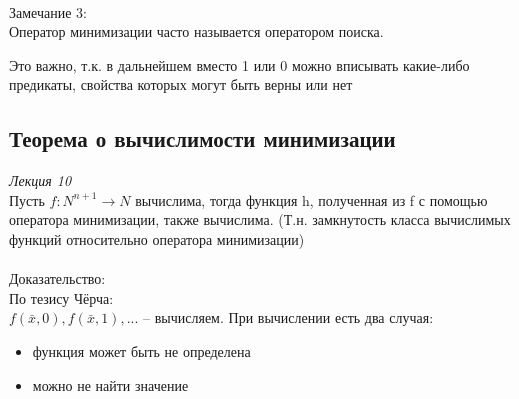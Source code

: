\documentclass{article}
\begin{document}
        \\Замечание 3:\\
        Оператор минимизации часто называется оператором поиска.
        
        Это важно, т.к. в дальнейшем вместо 1 или 0 можно вписывать какие-либо предикаты, свойства которых могут быть верны или нет
    
    \subsection{Теорема о вычислимости минимизации}
    \emph{Лекция 10}\\
        
        Пусть $f: N^{n + 1} \rightarrow N$ вычислима, тогда функция h, полученная из f с помощью оператора минимизации, также вычислима. (Т.н. замкнутость класса вычислимых функций относительно оператора минимизации)\\
        \\Доказательство:\\
        По тезису Чёрча:\\
        $f(\bar x, 0), f(\bar x, 1), ... $ -- вычисляем. При вычислении есть два случая:
        \begin{itemize}
            \item функция может быть не определена
            \item можно не найти значение
        \end{itemize}
        
\end{document}
